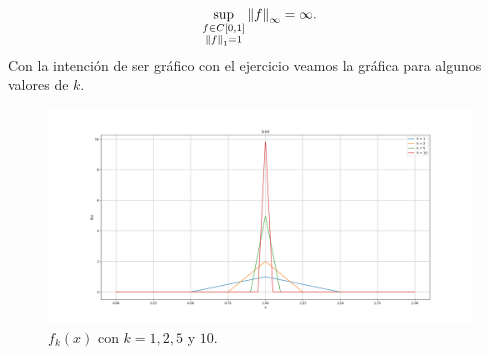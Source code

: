 \begin{homeworkProblem}
\begin{solution}
\begin{enumerate}[(i)]
      \begin{align*}
        \sup_{\substack{f\in C[0,1]\\ \left\|f\right\|_{1}=1}}\left\|f\right\|_{\infty}=\infty.
      \end{align*}
      Con la intención de ser gráfico con el ejercicio veamos la gráfica para algunos valores de $k$.
      \begin{figure}[H]
      \begin{center}
        \includegraphics[scale=0.33]{Figures/graficacontraejemplo.png}
      \end{center}
        \caption{$f_k(x)$ con $k=1,2,5$ y $10$.}
      \end{figure} 
    \end{enumerate}
  \end{solution}
\end{homeworkProblem}
